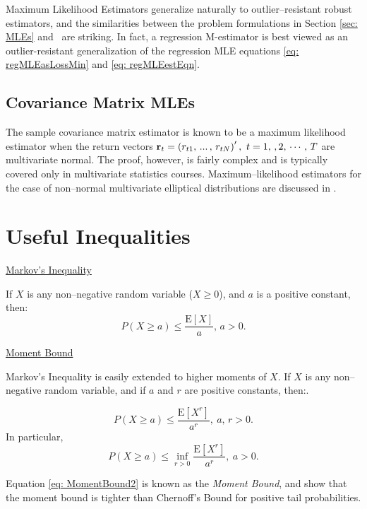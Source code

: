 \documentclass[graybox,envcountchap,sectrefs]{svmono}\usepackage[]{graphicx}\usepackage[]{xcolor}
\begin{document}
\begin{appendices}
Maximum Likelihood Estimators generalize naturally to outlier--resistant
robust estimators, and the similarities between the problem formulations
in Section \ref{sec: MLEs} and \RobustMethodsChapter\ are striking.
In fact, a regression M-estimator is best viewed as an outlier-resistant
generalization of the regression MLE equations \eqref{eq: regMLEasLossMin}
and \eqref{eq: regMLEestEqn}.

\subsection{Covariance Matrix MLEs}

The sample covariance matrix estimator is known to be a maximum likelihood
estimator when the return vectors ${\bf r}_{t}=\left(r_{t1},\,...\,,\,r_{tN}\right)^{\prime},\ t=1,\,,2,\,\cdots,\,T$
are multivariate normal. The proof, however, is fairly complex and
is typically covered only in multivariate statistics courses. Maximum--likelihood
estimators for the case of non--normal multivariate elliptical distributions
are discussed in \CrossSectionalFactorModelsChapter.

\section{Useful Inequalities}

\uline{Markov's Inequality}

If $X$ is any non--negative random variable ($X\geqslant0$), and
$a$ is a positive constant, then:
\begin{equation}
P(X\geqslant a)\leqslant\dfrac{\mathrm{E}\left[X\right]}{a},\,a>0.\label{eq: MarkovInequality}
\end{equation}

\uline{Moment Bound}

Markov's Inequality is easily extended to higher moments of $X$.
If $X$ is any non--negative random variable, and if $a$ and $r$
are positive constants, then:.

\begin{equation}
P(X\geqslant a)\leqslant\dfrac{\mathrm{E}\left[X^{r}\right]}{a^{r}},\ a,\,r>0.\label{eq: MomentBound1}
\end{equation}
In particular,
\begin{equation}
P(X\geqslant a)\leqslant\underset{r>0}{\inf}\dfrac{\mathrm{E}\left[X^{r}\right]}{a^{r}},\ a>0.\label{eq: MomentBound2}
\end{equation}

Equation \ref{eq: MomentBound2} is known as the \emph{Moment Bound},
and \citet{PhilipsNelson1995} show that the moment bound is tighter
than Chernoff's Bound for positive tail probabilities.


\end{appendices}
\end{document}
